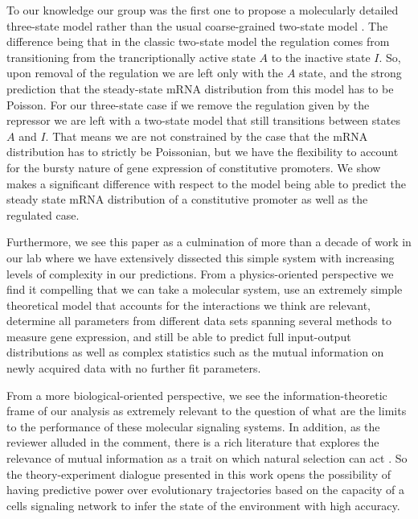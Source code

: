 To our knowledge our group was the first one to propose a molecularly detailed
three-state model rather than the usual coarse-grained two-state model
\cite{Phillips2015}. The difference being that in the classic two-state model
the regulation comes from transitioning from the trancriptionally active state
$A$ to the inactive state $I$. So, upon removal of the regulation we are left
only with the $A$ state, and the strong prediction that the steady-state mRNA
distribution from this model has to be Poisson. For our three-state case if we
remove the regulation given by the repressor we are left with a two-state model
that still transitions between states $A$ and $I$. That means we are not
constrained by the case that the mRNA distribution has to strictly be
Poissonian, but we have the flexibility to account for the bursty nature of gene
expression of constitutive promoters. We show makes a significant difference
with respect to the model being able to predict the steady state mRNA
distribution of a constitutive promoter as well as the regulated case.

Furthermore, we see this paper as a culmination of more than a decade of work
in our lab where we have extensively dissected this simple system with
increasing levels of complexity in our predictions. From a physics-oriented
perspective we find it compelling that we can take a molecular system, use an
extremely simple theoretical model that accounts for the interactions we think
are relevant, determine all parameters from different data sets spanning several
methods to measure gene expression, and still be able to predict full
input-output distributions as well as complex statistics such as the mutual
information on newly acquired data with no further fit parameters.

From a more biological-oriented perspective, we see the information-theoretic
frame of our analysis as extremely relevant to the question of what are the
limits to the performance of these molecular signaling systems. In addition, as
the reviewer alluded in the comment, there is a rich literature that explores
the relevance of mutual information as a trait on which natural selection can
act \cite{Bergstrom2004, Taylor2007, Tkacik2008, Nemenman2010}. So the
theory-experiment dialogue presented in this work opens the possibility of
having predictive power over evolutionary trajectories based on the capacity of
a cells signaling network to infer the state of the environment with high
accuracy.
